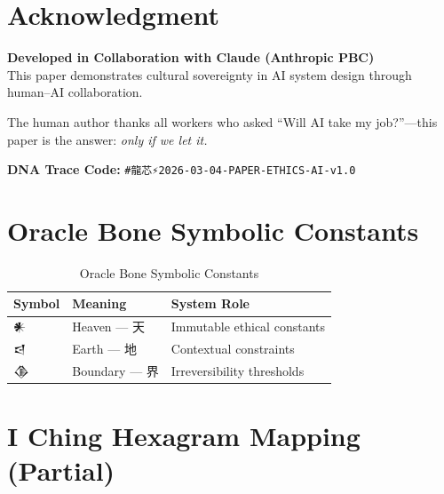 \documentclass[conference]{IEEEtran}
\begin{document}
\section*{Acknowledgment}

\begin{center}
\large\textcolor{anthro}{\textbf{
Developed in Collaboration with Claude (Anthropic PBC)}}\\
\normalsize\textcolor{anthro}{
This paper demonstrates cultural sovereignty in AI system design
through human--AI collaboration.}
\end{center}

\vspace{0.3em}
The human author thanks all workers who asked
``Will AI take my job?''---this paper is the answer:
\textit{only if we let it.}

\textbf{DNA Trace Code:}
\texttt{\#龍芯⚡️2026-03-04-PAPER-ETHICS-AI-v1.0}




\appendix

\section{Oracle Bone Symbolic Constants}

\begin{table}[!ht]
\caption{Oracle Bone Symbolic Constants}
\label{tab:oracle}
\centering
\begin{tabular}{lll}
\toprule
\textbf{Symbol} & \textbf{Meaning} & \textbf{System Role} \\
\midrule
𒀭 & Heaven — 天 & Immutable ethical constants \\
𒁀 & Earth — 地 & Contextual constraints \\
𒆠 & Boundary — 界 & Irreversibility thresholds \\
\bottomrule
\end{tabular}
\end{table}

\section{I Ching Hexagram Mapping (Partial)}
\end{document}
